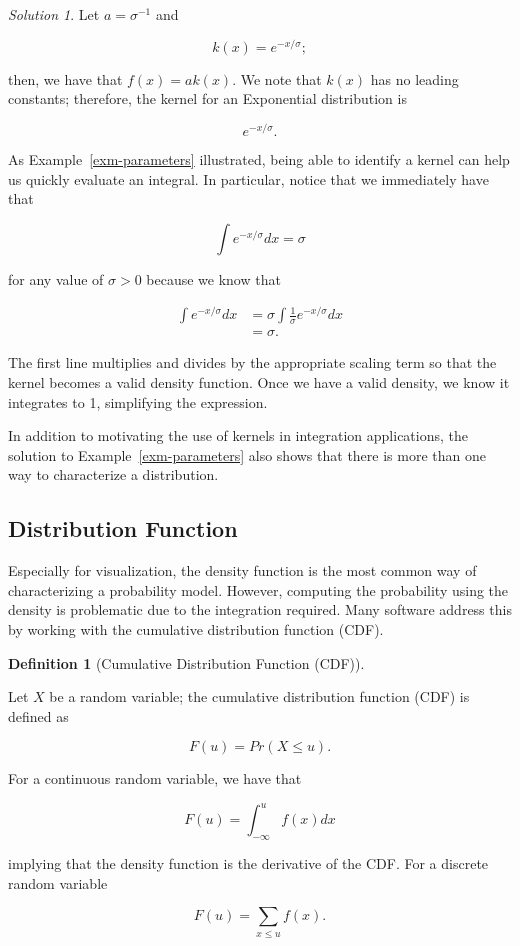 \documentclass[
  letterpaper,
  DIV=11,
  numbers=noendperiod]{scrreprt}
\theoremstyle{definition}
\theoremstyle{definition}
\newtheorem{definition}{Definition}[chapter]
\theoremstyle{plain}
\theoremstyle{remark}
\newtheorem*{solution}{Solution}
\begin{document}
\begin{solution}

Let \(a = \sigma^{-1}\) and

\[k(x) = e^{-x/\sigma};\]

then, we have that \(f(x) = a k(x)\). We note that \(k(x)\) has no
leading constants; therefore, the kernel for an Exponential distribution
is

\[e^{-x/\sigma}.\]

\end{solution}

As Example~\ref{exm-parameters} illustrated, being able to identify a
kernel can help us quickly evaluate an integral. In particular, notice
that we immediately have that

\[\int e^{-x/\sigma} dx = \sigma\]

for any value of \(\sigma > 0\) because we know that

\[
\begin{aligned}
  \int e^{-x / \sigma} dx 
    &= \sigma \int \frac{1}{\sigma} e^{-x / \sigma} dx \\
    &= \sigma.
\end{aligned}
\]

The first line multiplies and divides by the appropriate scaling term so
that the kernel becomes a valid density function. Once we have a valid
density, we know it integrates to 1, simplifying the expression.

In addition to motivating the use of kernels in integration
applications, the solution to Example~\ref{exm-parameters} also shows
that there is more than one way to characterize a distribution.

\hypertarget{distribution-function}{%
\subsection{Distribution Function}\label{distribution-function}}

Especially for visualization, the density function is the most common
way of characterizing a probability model. However, computing the
probability using the density is problematic due to the integration
required. Many software address this by working with the cumulative
distribution function (CDF).

\begin{definition}[Cumulative Distribution Function
(CDF)]\protect\hypertarget{def-cdf}{}\label{def-cdf}

Let \(X\) be a random variable; the cumulative distribution function
(CDF) is defined as

\[F(u) = Pr(X \leq u).\]

For a continuous random variable, we have that

\[F(u) = \int_{-\infty}^{u} f(x) dx\]

implying that the density function is the derivative of the CDF. For a
discrete random variable

\[F(u) = \sum_{x \leq u} f(x).\]

\end{definition}
\end{document}
